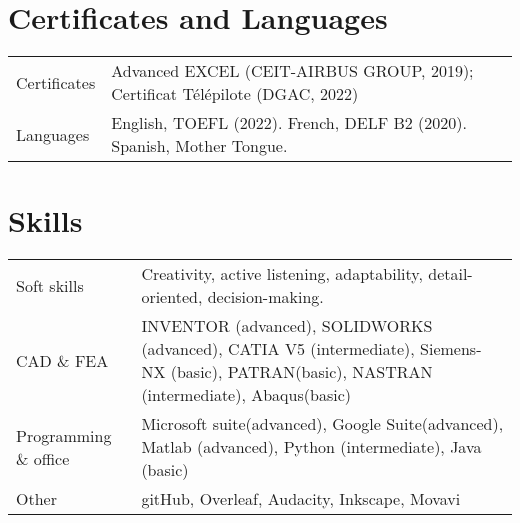 \documentclass[a4paper,12pt]{article}
\begin{document}



\section{Certificates and Languages}
\begin{tabularx}{\linewidth}{@{}l X@{}}
Certificates &  \normalsize{Advanced EXCEL (CEIT-AIRBUS GROUP, 2019); Certificat Télépilote (DGAC, 2022)}\\
Languages  &  \normalsize{English, TOEFL (2022). French, DELF B2 (2020). Spanish, Mother Tongue.}\\
\end{tabularx}


\section{Skills}
\begin{tabularx}{\linewidth}{@{}l X@{}}
Soft skills & Creativity, active listening, adaptability, detail-oriented, decision-making.\\
CAD \& FEA &  \normalsize{INVENTOR (advanced), SOLIDWORKS (advanced), CATIA V5 (intermediate), Siemens-NX (basic), PATRAN(basic), NASTRAN (intermediate), Abaqus(basic)}\\
Programming \& office & \normalsize{Microsoft suite(advanced), Google Suite(advanced), Matlab (advanced), Python (intermediate), Java (basic)}\\
Other & \normalsize{gitHub, Overleaf, Audacity, Inkscape, Movavi}
\end{tabularx}

\vfill
{}
\end{document}
